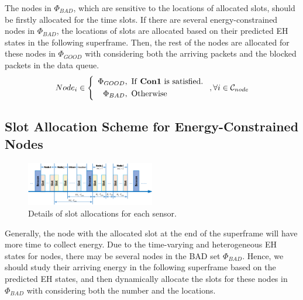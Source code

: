 \documentclass[journal,10pt]{IEEEtran}
\begin{document}
The nodes in ${\Phi _{BAD}}$, which are sensitive to the locations of allocated slots, should be firstly allocated for the time slots. If there are several energy-constrained nodes in ${\Phi _{BAD}}$, the locations of slots are allocated based on their predicted EH states in the following superframe.
Then, the rest of the nodes are allocated for these nodes in ${\Phi _{GOOD}}$ with considering both the arriving packets and the blocked packets in the data queue.
\begin{equation} \small
Node_{i} \in \left\{ { \begin{array}{l}
\begin{aligned}
{\Phi _{GOOD}} &, \text{  If \textbf{Con1} is satisfied.} \\
{\Phi _{BAD}} &, \text{ Otherwise}
\end{aligned}
\end{array}}\right. , \forall i \in \mathcal{C}_{node}
\end{equation}


\subsection{Slot Allocation Scheme for Energy-Constrained Nodes}
\begin{figure}[!htb]
\centering
\includegraphics[width=0.5\textwidth]{slot_allocation}
\caption{Details of slot allocations for each sensor.}
\label{fig:slot_allocation}
\end{figure}



Generally, the node with the allocated slot at the end of the superframe will have more time to collect energy.
Due to the time-varying and heterogeneous EH states for nodes, there may be several nodes in the BAD set ${\Phi _{BAD}}$. Hence, we should study their arriving energy in the following superframe based on the predicted EH states, and then dynamically allocate the slots for these nodes in ${\Phi _{BAD}}$ with considering both the number and the locations.
\end{document}
